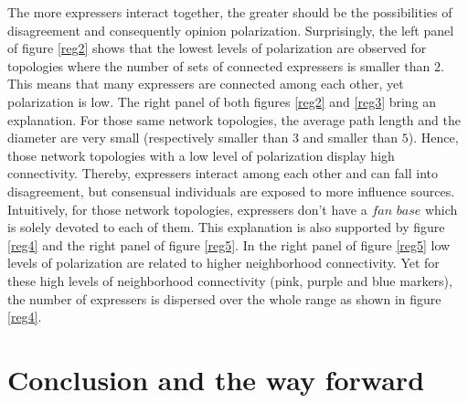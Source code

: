 \documentclass{article}
\begin{document}
The more expressers interact together, the greater should be the possibilities of disagreement and consequently opinion polarization. Surprisingly, the left panel of figure \ref{reg2} shows that the lowest levels of polarization are observed for topologies where the number of sets of connected expressers is smaller than $2$. This means that many expressers are connected among each other, yet polarization is low. The right panel of both figures \ref{reg2} and \ref{reg3} bring an explanation. For those same network topologies, the average path length and the diameter are very small (respectively smaller than $3$ and smaller than $5$). Hence, those network topologies with a low level of polarization display high connectivity. Thereby, expressers interact among each other and can fall into disagreement, but consensual individuals are exposed to more influence sources. Intuitively, for those network topologies, expressers  don't have a $fan$ $base$ which is solely devoted to each of them. This explanation is also supported by figure \ref{reg4} and the right panel of figure \ref{reg5}. In the right panel of figure \ref{reg5} low levels of polarization are related to higher neighborhood connectivity. Yet for these high levels of neighborhood connectivity (pink, purple and blue markers), the number of expressers is dispersed over the whole range as shown in figure \ref{reg4}.   %

\section{Conclusion and the way forward} \label{conclusion}
\end{document}
